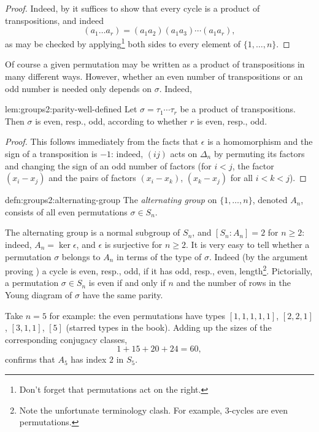 \begin{proof}
  Indeed, by  it suffices to
  show that every cycle is a product of transpositions, and indeed
  \[
    (a_1 \dots a_r) = (a_1 a_2)(a_1 a_3)\cdots(a_1 a_r),
  \]
  as may be checked by applying\footnote{Don't forget that
    permutations act on the right.} both sides to every element of
  $\{1,\dots,n\}$.
\end{proof}
Of course a given permutation may be written as a product of
transpositions in many different ways. However, whether an even number
of transpositions or an odd number is needed only depends on
$\sigma$. Indeed,

\begin{lem}{}{lem:groups2:parity-well-defined}
  Let $\sigma = \tau_1 \cdots \tau_r$ be a product of
  transpositions. Then $\sigma$ is even, resp., odd, according to
  whether $r$ is even, resp., odd.
\end{lem}

\begin{proof}
  This follows immediately from the facts that $\epsilon$ is a
  homomorphism and the sign of a transposition is $-1$: indeed, $(ij)$
  acts on $\Delta_n$ by permuting its factors and changing the sign of
  an odd number of factors (for $i < j$, the factor $(x_i - x_j)$ and
  the pairs of factors $(x_i - x_k)$, $(x_k - x_j)$ for all
  $i < k < j$).
\end{proof}
\begin{defn}{}{defn:groups2:alternating-group}
  The \emph{alternating group} on $\{1,\dots,n\}$, denoted $A_n$,
  consists of all even permutations $\sigma \in S_n$.
\end{defn}

The alternating group is a normal subgroup of $S_n$, and
$[S_n : A_n] = 2$ for $n \geq 2$: indeed, $A_n = \ker\epsilon$, and
$\epsilon$ is surjective for $n \geq 2$.  It is very easy to tell
whether a permutation $\sigma$ belongs to $A_n$ in terms of the type
of $\sigma$. Indeed (by the argument proving
) a cycle is even, resp.,
odd, if it has odd, resp., even, length\footnote{Note the unfortunate
  terminology clash. For example, $3$-cycles are even
  permutations.}. Pictorially, a permutation $\sigma \in S_n$ is even
if and only if $n$ and the number of rows in the Young diagram of
$\sigma$ have the same parity.

Take $n = 5$ for example: the even permutations have types
$[1,1,1,1,1]$, $[2,2,1]$, $[3,1,1]$, $[5]$ (starred types in the
book). Adding up the sizes of the corresponding conjugacy classes,
\[
  1 + 15 + 20 + 24 = 60,
\]
confirms that $A_5$ has index $2$ in $S_5$.

